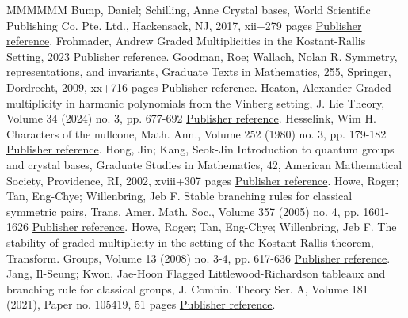 \begin{thebibliography}{MMMMMM}
 Bump, Daniel; Schilling, Anne Crystal bases, World Scientific Publishing Co. Pte. Ltd., Hackensack, NJ, 2017, xii+279 pages \href{https://alco.centre-mersenne.org/articles/10.5802/alco.391/#BumpSchilling2017}{Publisher reference}.
 Frohmader, Andrew Graded Multiplicities in the Kostant-Rallis Setting, 2023 \href{https://alco.centre-mersenne.org/articles/10.5802/alco.391/#frohmader2023graded}{Publisher reference}.
 Goodman, Roe; Wallach, Nolan R. Symmetry, representations, and invariants, Graduate Texts in Mathematics, 255, Springer, Dordrecht, 2009, xx+716 pages \href{https://alco.centre-mersenne.org/articles/10.5802/alco.391/#GoodmanWallach2009}{Publisher reference}.
 Heaton, Alexander Graded multiplicity in harmonic polynomials from the Vinberg setting, J. Lie Theory, Volume 34 (2024) no. 3, pp. 677-692 \href{https://alco.centre-mersenne.org/articles/10.5802/alco.391/#heaton2023graded}{Publisher reference}.
 Hesselink, Wim H. Characters of the nullcone, Math. Ann., Volume 252 (1980) no. 3, pp. 179-182 \href{https://alco.centre-mersenne.org/articles/10.5802/alco.391/#Hesselink1980}{Publisher reference}.
 Hong, Jin; Kang, Seok-Jin Introduction to quantum groups and crystal bases, Graduate Studies in Mathematics, 42, American Mathematical Society, Providence, RI, 2002, xviii+307 pages \href{https://alco.centre-mersenne.org/articles/10.5802/alco.391/#HongKang2002}{Publisher reference}.
 Howe, Roger; Tan, Eng-Chye; Willenbring, Jeb F. Stable branching rules for classical symmetric pairs, Trans. Amer. Math. Soc., Volume 357 (2005) no. 4, pp. 1601-1626 \href{https://alco.centre-mersenne.org/articles/10.5802/alco.391/#HoweTanWillenbring2005}{Publisher reference}.
 Howe, Roger; Tan, Eng-Chye; Willenbring, Jeb F. The stability of graded multiplicity in the setting of the Kostant-Rallis theorem, Transform. Groups, Volume 13 (2008) no. 3-4, pp. 617-636 \href{https://alco.centre-mersenne.org/articles/10.5802/alco.391/#HoweTanWillenbring2008}{Publisher reference}.
 Jang, Il-Seung; Kwon, Jae-Hoon Flagged Littlewood-Richardson tableaux and branching rule for classical groups, J. Combin. Theory Ser. A, Volume 181 (2021), Paper no. 105419, 51 pages \href{https://alco.centre-mersenne.org/articles/10.5802/alco.391/#KwonJang2021}{Publisher reference}.

\end{thebibliography}
